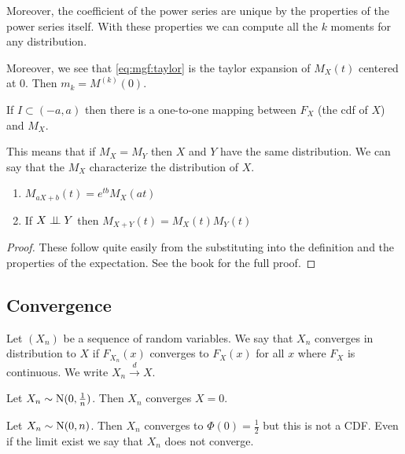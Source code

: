 \documentclass[12pt]{extarticle}
\newcommand{\Normal}{{\operatorfont N}}
\begin{document}
Moreover, the coefficient of the power series are unique by the properties of the power series itself.
With these properties we can compute all the $k$ moments for any distribution.

Moreover, we see that \autoref{eq:mgf:taylor} is the taylor expansion of $M_X(t)$ centered at $0$. Then $m_k = M^{(k)}(0)$.

\begin{proposition}
    If $I \subset (-a, a)$ then there is a one-to-one mapping between $F_X$ (the cdf of $X$) and $M_X$.

    This means that if $M_X = M_Y$ then $X$ and $Y$ have the same distribution.
    We can say that the $M_X$ characterize the distribution of $X$.
\end{proposition}

\begin{proposition}
    \label{prop:mgf:props_of_mgf}
    \skiplineafterproof
    \begin{enumerate}
        \item $M_{aX + b}(t) = e^{tb} M_X (at)$
        \item If $X \perp \!\!\! \perp Y$ then $M_{X+Y}(t) = M_X(t) M_Y(t)$
    \end{enumerate}
\end{proposition}
\begin{proof}
    These follow quite easily from the substituting into the definition and the properties of the expectation.
    See the book for the full proof.
\end{proof}

\subsection{Convergence}

\begin{definition}
    Let $\left(X_n\right)$ be a sequence of random variables.
    We say that $X_n$ converges in distribution to $X$ if $F_{X_n}(x)$ converges to $F_X(x)$ for all $x$ where $F_X$ is continuous.
    We write $X_n \stackrel{d}{\to} X$.
\end{definition}

\begin{example}
    Let $X_n \sim \Normal(0, \frac{1}{n})$.
    Then $X_n$ converges $X = 0$.
\end{example}
\begin{example}
    Let $X_n \sim \Normal(0, n)$.
    Then $X_n$ converges to $\Phi(0) = \frac{1}{2}$ but this is not a CDF.
    Even if the limit exist we say that $X_n$ does not converge.
\end{example}
\end{document}
